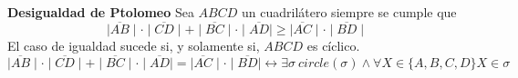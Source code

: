 \begin{theorem} \label{th_51M04_ptolomeys_ineq} \textbf{Desigualdad de Ptolomeo}
	Sea $ABCD$ un cuadrilátero siempre se cumple que 
	\begin{equation} \label{eq_th_51M04_ptolomeys_ineq_1}
		\mid\overline{AB}\mid \cdot \mid\overline{CD}\mid + \mid\overline{BC}\mid \cdot \mid\overline{AD}\mid \geq \mid\overline{AC}\mid \cdot \mid\overline{BD}\mid
	\end{equation}
	El caso de igualdad sucede si, y solamente si, $ABCD$ es cíclico.
	\begin{equation} \label{eq_th_51M04_ptolomeys_ineq_2}
		\mid\overline{AB}\mid \cdot \mid\overline{CD}\mid + \mid\overline{BC}\mid \cdot \mid\overline{AD}\mid = \mid\overline{AC}\mid \cdot \mid\overline{BD}\mid \leftrightarrow \exists \sigma\ circle(\sigma) \land \forall X \in \{A,B,C,D\} X \in \sigma
	\end{equation}
\end{theorem}